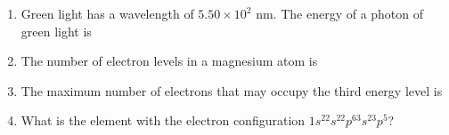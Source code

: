\documentclass[main.tex]{subfiles}
\begin{document}
\begin{fullwidth}
\begin{multicols*}{2}
\begin{enumerate}
		




\item Green light has a wavelength of $5.50\times 10^2$ nm.  The energy of a photon of green light is
\begin{enumerate}[label=(\alph*)]\vspace{-0.5cm}
\end{enumerate}\vspace{-0.5cm}


\item The number of electron levels in a magnesium atom is
\begin{enumerate}[label=(\alph*)]\vspace{-0.5cm}
\end{enumerate}\vspace{-0.5cm}


\item The maximum number of electrons that may occupy the third energy level is
\begin{enumerate}[label=(\alph*)]\vspace{-0.5cm}
\end{enumerate}\vspace{-0.5cm}

\item What is the element with the electron configuration $1s^22s^22p^63s^23p^5$?
\begin{enumerate}[label=(\alph*)]\vspace{-0.5cm}
\end{enumerate}\vspace{-0.5cm}


\end{enumerate}
\end{multicols*}
\end{fullwidth}
\end{document}
